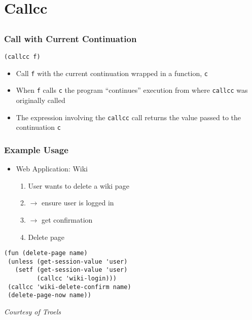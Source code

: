 \documentclass{beamer}
\begin{document}
\section{Callcc}
\subsection{} 
\begin{frame}[fragile]
\frametitle{Call with Current Continuation}

\begin{lstlisting}
(callcc f)
\end{lstlisting}

\begin{itemize}
\item Call \texttt{f} with the current continuation wrapped in a
  function, \texttt{c}
\item When \texttt{f} calls \texttt{c} the program ``continues''
  execution from where \texttt{callcc} was originally called
\item The expression involving the \texttt{callcc} call returns the
  value passed to the continuation \texttt{c}
\end{itemize}
\end{frame}

\begin{frame}[fragile]
\frametitle{Example Usage}
\begin{itemize}
\item Web Application: Wiki
  \begin{enumerate}
  \item User wants to delete a wiki page
  \item $\rightarrow$ ensure user is logged in 
  \item $\rightarrow$ get confirmation
  \item Delete page
  \end{enumerate}
\end{itemize}

\pause

\lstset{basicstyle=\footnotesize\ttfamily}
\begin{lstlisting}
(fun (delete-page name)
 (unless (get-session-value 'user)
   (setf (get-session-value 'user) 
         (callcc 'wiki-login)))
 (callcc 'wiki-delete-confirm name)
 (delete-page-now name))
\end{lstlisting}
\small
\emph{Courtesy of Troels}

\end{frame}
\end{document}
